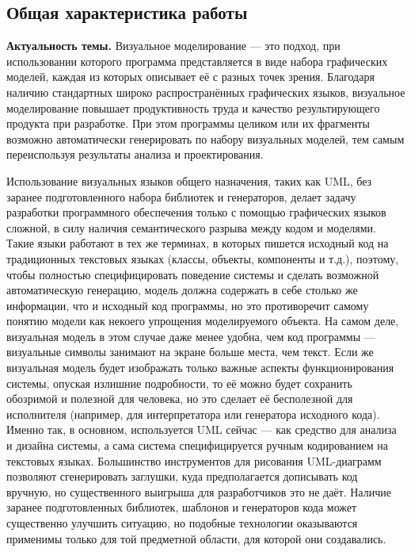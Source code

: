 \subsection*{\Large Общая характеристика работы}
\fontsize{14pt}{15pt}\selectfont
\textbf{Актуальность темы.}
Визуальное моделирование --- это подход, при использовании которого программа представляется 
в виде набора графических моделей, каждая из которых описывает её с разных точек 
зрения. Благодаря наличию стандартных широко распространённых графических языков, 
визуальное моделирование повышает продуктивность труда и качество результирующего 
продукта при разработке. При этом программы целиком или их фрагменты возможно 
автоматически генерировать по набору визуальных моделей, тем самым переиспользуя результаты
анализа и проектирования.

Использование визуальных языков общего назначения, таких как UML, без заранее 
подготовленного набора библиотек и генераторов, делает задачу разработки 
программного обеспечения только с помощью графических языков сложной, 
в силу наличия семантического разрыва между кодом и моделями. Такие языки работают в 
тех же терминах, в которых пишется исходный код на традиционных текстовых языках 
(классы, объекты, компоненты и т.д.), поэтому, чтобы полностью специфицировать 
поведение системы и сделать возможной автоматическую генерацию, модель должна 
содержать в себе столько же информации, что и исходный код программы, но это 
противоречит самому понятию модели как некоего упрощения моделируемого объекта. 
На самом деле, визуальная модель в этом случае даже менее удобна, чем код 
программы --- визуальные символы занимают на экране больше места, чем текст. 
Если же визуальная модель будет изображать только важные аспекты 
функционирования системы, опуская излишние подробности, то её можно будет 
сохранить обозримой и полезной для человека, но это сделает её бесполезной для 
исполнителя (например, для интерпретатора или генератора исходного кода). 
Именно так, в основном, используется UML сейчас --- как средство для анализа и 
дизайна системы, а сама система специфицируется ручным кодированием на текстовых 
языках. Большинство инструментов для рисования UML-диаграмм позволяют 
сгенерировать заглушки, куда предполагается дописывать код вручную, но 
существенного выигрыша для разработчиков это не даёт. Наличие заранее подготовленных 
библиотек, шаблонов и генераторов кода может существенно улучшить ситуацию, но подобные 
технологии оказываются применимы только для той предметной области, для которой они создавались.

